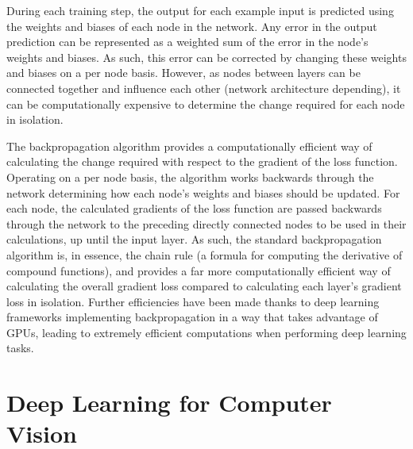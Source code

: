 During each training step, the output for each example input is predicted using the weights and biases of each node in the network. Any error in the output prediction can be represented as a weighted sum of the error in the node's weights and biases. As such, this error can be corrected by changing these weights and biases on a per node basis. However, as nodes between layers can be connected together and influence each other (network architecture depending), it can be computationally expensive to determine the change required for each node in isolation.

The backpropagation algorithm provides a computationally efficient way of calculating the change required with respect to the gradient of the loss function. Operating on a per node basis, the algorithm works backwards through the network determining how each node's weights and biases should be updated. For each node, the calculated gradients of the loss function are passed backwards through the network to the preceding directly connected nodes to be used in their calculations, up until the input layer. As such, the standard backpropagation algorithm is, in essence, the chain rule (a formula for computing the derivative of compound functions), and provides a far more computationally efficient way of calculating the overall gradient loss compared to calculating each layer's gradient loss in isolation. Further efficiencies have been made thanks to deep learning frameworks implementing backpropagation in a way that takes advantage of GPUs, leading to extremely efficient computations when performing deep learning tasks.

\section{Deep Learning for Computer Vision}\label{ch:Background,sec:DLforCV}

